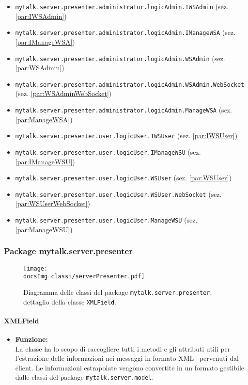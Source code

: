 {{\begin{sloppypar}
{\begin{itemize}
		\item[] \texttt{mytalk.server.presenter.administrator.logicAdmin.IWSAdmin} (sez. \ref{par:IWSAdmin})
		\item[] \texttt{mytalk.server.presenter.administrator.logicAdmin.IManageWSA} (sez. \ref{par:IManageWSA})
		\item[] \texttt{mytalk.server.presenter.administrator.logicAdmin.WSAdmin} (sez. \ref{par:WSAdmin})
		\item[] \texttt{mytalk.server.presenter.administrator.logicAdmin.WSAdmin.WebSocket} (sez. \ref{par:WSAdminWebSocket})
		\item[] \texttt{mytalk.server.presenter.administrator.logicAdmin.ManageWSA} (sez. \ref{par:ManageWSA})
		\item[] \texttt{mytalk.server.presenter.user.logicUser.IWSUser} (sez. \ref{par:IWSUser})
		\item[] \texttt{mytalk.server.presenter.user.logicUser.IManageWSU} (sez. \ref{par:IManageWSU})
		\item[] \texttt{mytalk.server.presenter.user.logicUser.WSUser} (sez. \ref{par:WSUser})
		\item[] \texttt{mytalk.server.presenter.user.logicUser.WSUser.WebSocket} (sez. \ref{par:WSUserWebSocket})
		\item[] \texttt{mytalk.server.presenter.user.logicUser.ManageWSU} (sez. \ref{par:ManageWSU})
	\end{itemize}

	\subsubsection{Package mytalk.server.presenter}{
	
		\begin{figure}[h!tbp]
		\centering
		\label{fig:presenterXMLField}
		\texttt{[image: \\docsImg classi/serverPresenter.pdf]}
\caption{Diagramma delle classi del package \nolinkurl{mytalk.server.presenter}; dettaglio della classe \nolinkurl{XMLField}.}		
	\end{figure}	
		
		\paragraph{XMLField}\label{par:XMLField}{
			\begin{itemize}
			\item[] \textbf{Funzione:}\\
				La classe ha lo scopo di raccogliere tutti i metodi e gli attributi utili per l'estrazione delle informazioni nei messaggi in formato XML\g~ pervenuti dal client\g. Le informazioni estrapolate vengono convertite in un formato gestibile dalle classi del package \texttt{mytalk.server.model}.\\
			

\end{itemize}}}}
\end{sloppypar}}}
